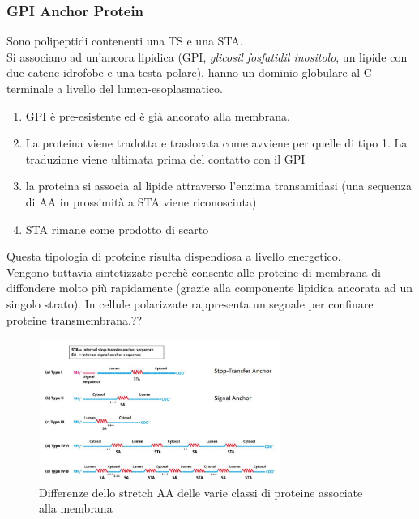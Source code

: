         \subsubsection{GPI Anchor Protein}
            Sono polipeptidi contenenti una TS e una STA.\\
            Si associano ad un'ancora lipidica (GPI, \textit{glicosil fosfatidil inositolo}, un lipide con due catene idrofobe e una testa polare), hanno un dominio globulare al C-terminale a livello del lumen-esoplasmatico.
            \begin{enumerate}
                \item GPI è pre-esistente ed è già ancorato alla membrana.
                \item La proteina viene tradotta e traslocata come avviene per quelle di tipo 1. La traduzione viene ultimata prima del contatto con il GPI
                \item la proteina si associa al lipide attraverso l'enzima transamidasi (una sequenza di AA in prossimità a STA viene riconosciuta)
                \item STA rimane come prodotto di scarto
            \end{enumerate}
            Questa tipologia di proteine risulta dispendiosa a livello energetico. \\
            Vengono tuttavia sintetizzate perchè consente alle proteine di membrana di diffondere molto più rapidamente (grazie alla componente lipidica ancorata ad un singolo strato).
            In cellule polarizzate rappresenta un segnale per confinare proteine transmembrana.??
            \begin{figure}[h]
                \centering
                \includegraphics[width=0.7\textwidth]{images/sequenzeTopogeniche.JPG}
                \caption{\small Differenze dello stretch AA delle varie classi di proteine associate alla membrana}
                \label{fig:mesh1}
            \end{figure}
\pagebreak
            
